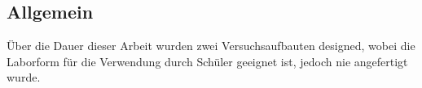 \subsection{Allgemein}

Über die Dauer dieser Arbeit wurden zwei Versuchsaufbauten designed, wobei die Laborform für die Verwendung durch Schüler geeignet ist, jedoch nie angefertigt wurde.
